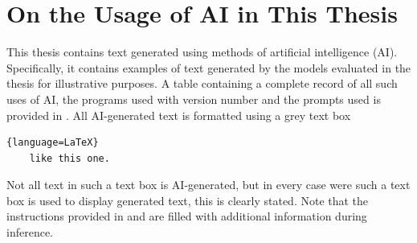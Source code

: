 \section{On the Usage of AI in This Thesis}\label{ai-usage}
This thesis contains text generated using methods of artificial intelligence (AI). Specifically, it contains examples of text generated by the models evaluated in the thesis for illustrative purposes. A table containing a complete record of all such uses of AI, the programs used with version number and the prompts used is provided in . All AI-generated text is formatted using a grey text box
\begin{lstlisting}{language=LaTeX}
    like this one.
\end{lstlisting}
Not all text in such a text box is AI-generated, but in every case were such a text box is used to display generated text, this is clearly stated. Note that the instructions provided in  and  are filled with additional information during inference. 

